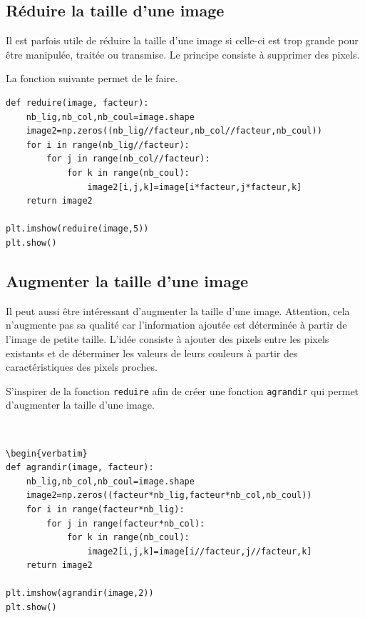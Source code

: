 \subsection{Réduire la taille d'une image}

Il est parfois utile de réduire la taille d'une image si celle-ci est trop grande pour être manipulée, traitée ou transmise. Le principe consiste à supprimer des pixels.

La fonction suivante permet de le faire.

\begin{verbatim}
def reduire(image, facteur):
    nb_lig,nb_col,nb_coul=image.shape
    image2=np.zeros((nb_lig//facteur,nb_col//facteur,nb_coul))
    for i in range(nb_lig//facteur):
        for j in range(nb_col//facteur):
            for k in range(nb_coul):
                image2[i,j,k]=image[i*facteur,j*facteur,k]
    return image2

plt.imshow(reduire(image,5))
plt.show()
\end{verbatim}

\subsection{Augmenter la taille d'une image}

Il peut aussi être intéressant d'augmenter la taille d'une image. Attention, cela n'augmente pas sa qualité car l'information ajoutée est déterminée à partir de l'image de petite taille. L'idée consiste à ajouter des pixels entre les pixels existants et de déterminer les valeurs de leurs couleurs à partir des caractéristiques des pixels proches.

\begin{exercice}
S'inspirer de la fonction \verb?reduire? afin de créer une fonction \verb?agrandir? qui permet d'augmenter la taille d'une image.
\end{exercice}

\begin{solution}~\\
\vspace{-0.7cm}
\begin{verbatim}
\begin{verbatim}
def agrandir(image, facteur):
    nb_lig,nb_col,nb_coul=image.shape
    image2=np.zeros((facteur*nb_lig,facteur*nb_col,nb_coul))
    for i in range(facteur*nb_lig):
        for j in range(facteur*nb_col):
            for k in range(nb_coul):
                image2[i,j,k]=image[i//facteur,j//facteur,k]
    return image2

plt.imshow(agrandir(image,2))
plt.show()
\end{verbatim} 
\end{solution}

